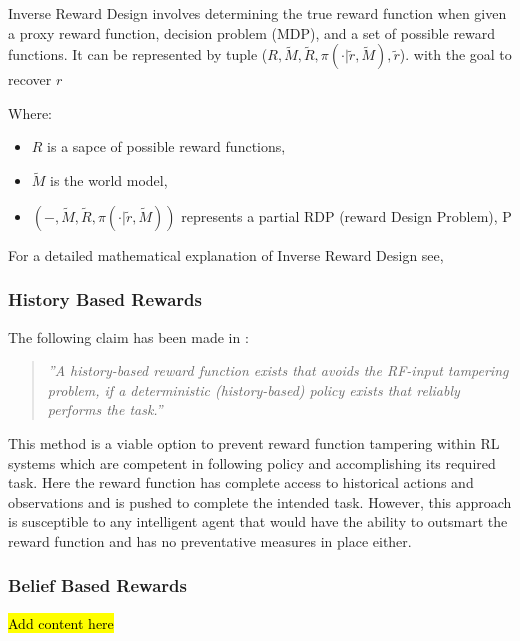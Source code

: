 Inverse Reward Design involves determining the true reward function when given a proxy reward function, decision problem (MDP), and a set of possible reward functions.
It can be represented by tuple ($R, \tilde{M}, \tilde{R}, \pi(\cdot|\tilde{r}, \tilde{M}), \tilde{r}$).
with the goal to recover $r$

Where:
\begin{itemize}
    \item $R$ is a sapce of possible reward functions,
    \item $\tilde{M}$ is the world model,
    \item $(-, \tilde{M}, \tilde{R}, \pi(\cdot|\tilde{r},\tilde{M}))$ represents a partial RDP (reward Design Problem), P
\end{itemize}

For a detailed mathematical explanation of Inverse Reward Design see, \cite{inverse-reward}

\subsubsection{History Based Rewards}
The following claim has been made in \cite{DBLP:journals/corr/abs-1908-04734}:
\begin{quote}
    \emph{''A history-based reward function exists that avoids the RF-input tampering
    problem, if a deterministic (history-based) policy exists that reliably performs the task.''}
\end{quote}

This method is a viable option to prevent reward function tampering within RL systems which are  competent in following policy and accomplishing its required task.
Here the reward function has complete access to historical actions and observations and is pushed to complete the intended task.
However, this approach is susceptible to any intelligent agent that would have the ability to outsmart the reward function and has no preventative measures in place either.

\subsubsection{Belief Based Rewards}
\hl{Add content here}


